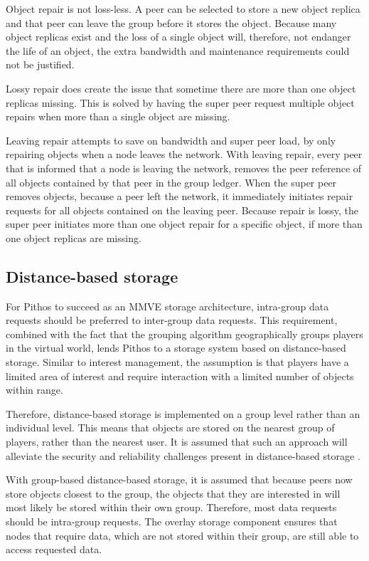 Object repair is not loss-less. A peer can be selected to store a new object replica and that peer can leave the group before it stores the object. Because many object replicas exist and the loss of a single object will, therefore, not endanger the life of an object, the extra bandwidth and maintenance requirements could not be justified.

Lossy repair does create the issue that sometime there are more than one object replicas missing. This is solved by having the super peer request multiple object repairs when more than a single object are missing.

Leaving repair attempts to save on bandwidth and super peer load, by only repairing objects when a node leaves the network. With leaving repair, every peer that is informed that a node is leaving the network, removes the peer reference of all objects contained by that peer in the group ledger. When the super peer removes objects, because a peer left the network, it immediately initiates repair requests for all objects contained on the leaving peer. Because repair is lossy, the super peer initiates more than one object repair for a specific object, if more than one object replicas are missing.

\subsection{Distance-based storage}

For Pithos to succeed as an MMVE storage architecture, intra-group data requests should be preferred to inter-group data requests. This requirement, combined with the fact that the grouping algorithm geographically groups players in the virtual world, lends Pithos to a storage system based on distance-based storage. Similar to interest management, the assumption is that players have a limited area of interest and require interaction with a limited number of objects within range.

Therefore, distance-based storage is implemented on a group level rather than an individual level. This means that objects are stored on the nearest group of players, rather than the nearest user. It is assumed that such an approach will alleviate the security and reliability challenges present in distance-based storage \cite{gilmore_p2p_mmog_state_persistency}.

With group-based distance-based storage, it is assumed that because peers now store objects closest to the group, the objects that they are interested in will most likely be stored within their own group. Therefore, most data requests should be intra-group requests. The overlay storage component ensures that nodes that require data, which are not stored within their group, are still able to access requested data.

